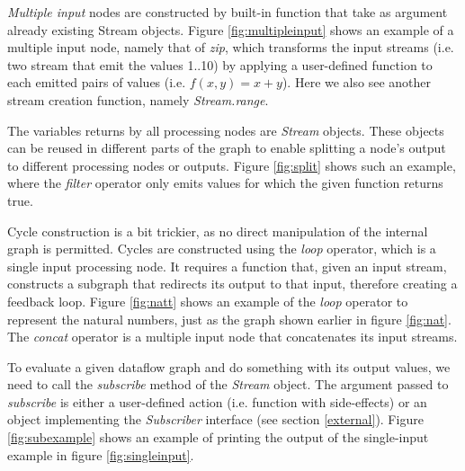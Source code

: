 \documentclass{dithesis}
\begin{document}

\textit{Multiple input} nodes are constructed by built-in function that take as argument already existing Stream objects. Figure \ref{fig:multipleinput} shows an example of a multiple input node, namely that of \textit{zip}, which transforms the input streams (i.e. two stream that emit the values 1..10) by applying a user-defined function to each emitted pairs of values (i.e. $f(x,y)=x+y$). Here we also see another stream creation function, namely \textit{Stream.range}.


The variables returns by all processing nodes are \textit{Stream} objects. These objects can be reused in different parts of the graph to enable splitting a node's output to different processing nodes or outputs. Figure \ref{fig:split} shows such an example, where the \textit{filter} operator only emits values for which the given function returns true.


Cycle construction is a bit trickier, as no direct manipulation of the internal graph is permitted. Cycles are constructed using the \textit{loop} operator, which is a single input processing node. It requires a function that, given an input stream, constructs a subgraph that redirects its output to that input, therefore creating a feedback loop. Figure \ref{fig:natt} shows an example of the \textit{loop} operator to represent the natural numbers, just as the graph shown earlier in figure \ref{fig:nat}. The \textit{concat} operator is a multiple input node that concatenates its input streams.



To evaluate a given dataflow graph and do something with its output values, we need to call the \textit{subscribe} method of the \textit{Stream} object. The argument passed to \textit{subscribe} is either a user-defined action (i.e. function with side-effects) or an object implementing the \textit{Subscriber} interface (see section \ref{external}). Figure \ref{fig:subexample} shows an example of printing the output of the single-input example in figure \ref{fig:singleinput}.

\end{document}
